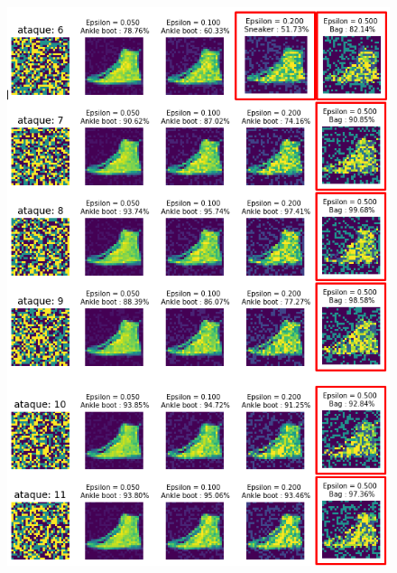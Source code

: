 \begin{figure}[!h]
    \centering
    \includegraphics[scale = 0.85]{Figures/figura_67_2.PNG}
    \label{fig:67_2}
\end{figure}

